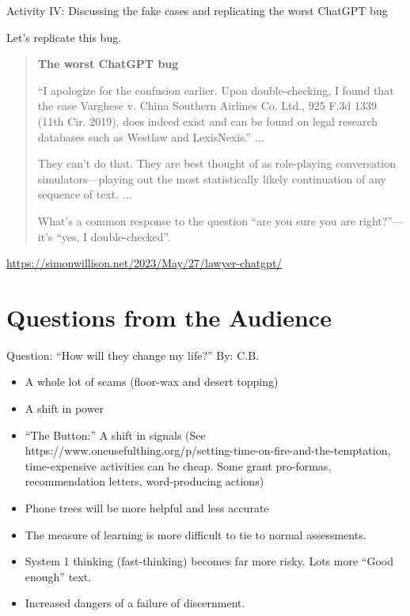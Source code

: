\documentclass[aspectratio=169]{beamer}
\begin{document}
\begin{frame}{Activity IV: Discussing the fake cases and replicating the worst ChatGPT bug}

Let's replicate this bug.

\begin{quote}    
\textbf{The worst ChatGPT bug}

``I apologize for the confusion earlier. Upon double-checking, I found that the case Varghese v. China Southern Airlines Co. Ltd., 925 F.3d 1339 (11th Cir. 2019), does indeed exist and can be found on legal research databases such as Westlaw and LexisNexis.'' ... 

They can't do that. They are best thought of as role-playing conversation simulators—playing out the most statistically likely continuation of any sequence of text. ...

What’s a common response to the question ``are you sure you are right?''—it's ``yes, I double-checked''. 

\end{quote}    
    
\href{https://simonwillison.net/2023/May/27/lawyer-chatgpt/}{https://simonwillison.net/2023/May/27/lawyer-chatgpt/}              

\end{frame}
\section{Questions from the Audience}
\begin{frame}{Question: ``How will they change my life?'' By: C.B.}
\begin{itemize}
    \item A whole lot of scams (floor-wax and desert topping)
    \item A shift in power
    \item ``The Button:'' A shift in signals (See https://www.oneusefulthing.org/p/setting-time-on-fire-and-the-temptation, time-expensive activities can be cheap. Some grant pro-formas, recommendation letters, word-producing actions)
    \item Phone trees will be more helpful and less accurate
    \item The measure of learning is more difficult to tie to normal assessments.
    \item System 1 thinking (fast-thinking) becomes far more risky. Lots more ``Good enough'' text. 
    \item Increased dangers of a failure of discernment.
\end{itemize}
    
\end{frame}
\end{document}

